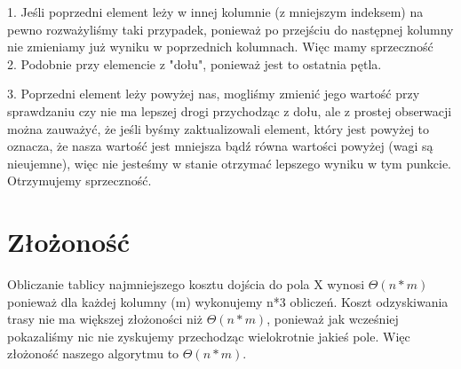 \documentclass[12pt,a4paper]{article}
\begin{document}
1. Jeśli poprzedni element leży w innej kolumnie (z mniejszym indeksem) na pewno rozważyliśmy taki przypadek, ponieważ po przejściu do następnej kolumny nie zmieniamy już wyniku w poprzednich kolumnach. Więc mamy sprzeczność \\

2. Podobnie przy elemencie z "dołu", ponieważ jest to ostatnia pętla.

3. Poprzedni element leży powyżej nas, mogliśmy zmienić jego wartość przy sprawdzaniu czy nie ma lepszej drogi przychodząc z dołu, ale z prostej obserwacji można zauważyć, że jeśli byśmy zaktualizowali element, który jest powyżej to oznacza, że nasza wartość jest mniejsza bądź równa wartości powyżej (wagi są nieujemne), więc nie jesteśmy w stanie otrzymać lepszego wyniku w tym punkcie. Otrzymujemy sprzeczność.

\section{Złożoność}
Obliczanie tablicy najmniejszego kosztu dojścia do pola X wynosi $\Theta(n*m)$ ponieważ dla każdej kolumny (m) wykonujemy n*3 obliczeń. Koszt odzyskiwania trasy nie ma większej złożoności niż $\Theta(n*m)$, ponieważ jak wcześniej pokazaliśmy nic nie zyskujemy przechodząc wielokrotnie jakieś pole. Więc złożoność naszego algorytmu to $\Theta(n*m)$.
\end{document}
